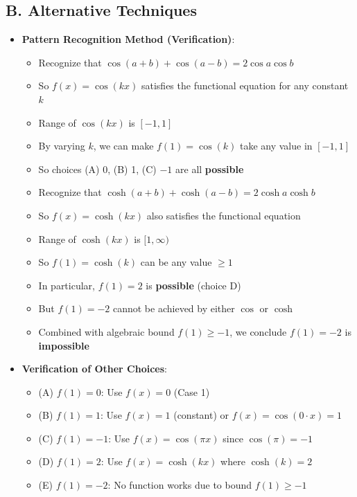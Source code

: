 \documentclass[12pt]{article}
\begin{document}
\begin{techniquesbox}
\subsection*{B. Alternative Techniques}
\begin{itemize}[leftmargin=*]
    \item \textbf{Pattern Recognition Method (Verification)}:
    \begin{itemize}
        \item Recognize that $\cos(a+b) + \cos(a-b) = 2\cos a \cos b$
        \item So $f(x) = \cos(kx)$ satisfies the functional equation for any constant $k$
        \item Range of $\cos(kx)$ is $[-1, 1]$
        \item By varying $k$, we can make $f(1) = \cos(k)$ take any value in $[-1, 1]$
        \item So choices (A) 0, (B) 1, (C) $-1$ are all \textbf{possible}
        \item Recognize that $\cosh(a+b) + \cosh(a-b) = 2\cosh a \cosh b$
        \item So $f(x) = \cosh(kx)$ also satisfies the functional equation
        \item Range of $\cosh(kx)$ is $[1, \infty)$
        \item So $f(1) = \cosh(k)$ can be any value $\geq 1$
        \item In particular, $f(1) = 2$ is \textbf{possible} (choice D)
        \item But $f(1) = -2$ cannot be achieved by either $\cos$ or $\cosh$
        \item Combined with algebraic bound $f(1) \geq -1$, we conclude $f(1) = -2$ is \textbf{impossible}
    \end{itemize}
    \item \textbf{Verification of Other Choices}:
    \begin{itemize}
        \item (A) $f(1) = 0$: Use $f(x) = 0$ (Case 1)
        \item (B) $f(1) = 1$: Use $f(x) = 1$ (constant) or $f(x) = \cos(0 \cdot x) = 1$
        \item (C) $f(1) = -1$: Use $f(x) = \cos(\pi x)$ since $\cos(\pi) = -1$
        \item (D) $f(1) = 2$: Use $f(x) = \cosh(kx)$ where $\cosh(k) = 2$
        \item (E) $f(1) = -2$: No function works due to bound $f(1) \geq -1$
    \end{itemize}
\end{itemize}


\end{techniquesbox}
\end{document}
